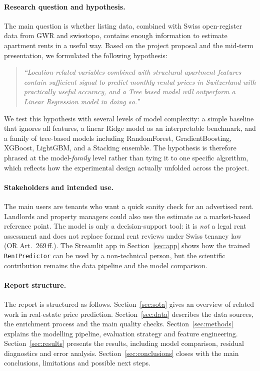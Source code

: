 \documentclass[11pt,a4paper]{article}
\begin{document}
\paragraph{Research question and hypothesis.}
The main question is whether listing data, combined with Swiss open-register data from GWR and swisstopo, contains enough information to estimate apartment rents in a useful way. Based on the project proposal and the mid-term presentation, we formulated the following hypothesis:

\begin{quote}\itshape
``Location-related variables combined with structural apartment features contain sufficient signal to predict monthly rental prices in Switzerland with practically useful accuracy, and a Tree based model will outperform a Linear Regression model in doing so.''
\end{quote}

We test this hypothesis with several levels of model complexity: a simple baseline that ignores all features, a linear Ridge model as an interpretable benchmark, and a family of tree-based models including RandomForest, GradientBoosting, XGBoost, LightGBM, and a Stacking ensemble. The hypothesis is therefore phrased at the model-\emph{family} level rather than tying it to one specific algorithm, which reflects how the experimental design actually unfolded across the project.

\paragraph{Stakeholders and intended use.}
The main users are tenants who want a quick sanity check for an advertised rent. Landlords and property managers could also use the estimate as a market-based reference point. The model is only a decision-support tool: it is \emph{not} a legal rent assessment and does not replace formal rent reviews under Swiss tenancy law (OR Art.~269\,ff.). The Streamlit app in Section~\ref{sec:app} shows how the trained \texttt{RentPredictor} can be used by a non-technical person, but the scientific contribution remains the data pipeline and the model comparison.

\paragraph{Report structure.}
The report is structured as follows. Section~\ref{sec:sota} gives an overview of related work in real-estate price prediction. Section~\ref{sec:data} describes the data sources, the enrichment process and the main quality checks. Section~\ref{sec:methods} explains the modelling pipeline, evaluation strategy and feature engineering. Section~\ref{sec:results} presents the results, including model comparison, residual diagnostics and error analysis. Section~\ref{sec:conclusions} closes with the main conclusions, limitations and possible next steps.
\end{document}
